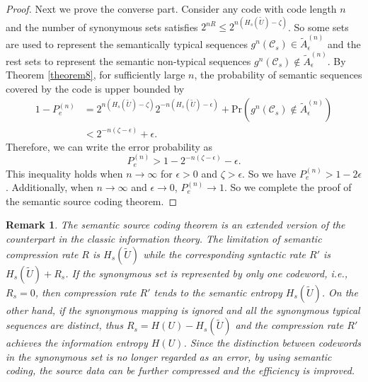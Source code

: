 \documentclass[12pt, draftclsnofoot,onecolumn]{IEEEtran}
\newtheorem{remark}{\bf{Remark}}
\begin{document}
\begin{proof}
Next we prove the converse part. Consider any code with code length $n$ and the number of synonymous sets satisfies $2^{nR}\leq 2^{n\left(H_s(\tilde{U})-\zeta\right)}$. So some sets are used to represent the semantically typical sequences $g^n\left(\mathcal{C}_s\right)\in \tilde{A}_{\epsilon}^{(n)}$ and the rest sets to represent the semantic non-typical sequences $g^n\left(\mathcal{C}_s\right)\notin \tilde{A}_{\epsilon}^{(n)}$. By Theorem \ref{theorem8}, for sufficiently large $n$, the probability of semantic sequences covered by the code is upper bounded by
\begin{equation}
\begin{aligned}
1-P_e^{(n)}&=2^{n\left(H_s(\tilde{U})-\zeta\right)}2^{-n\left(H_s(\tilde{U})-\epsilon\right)}+\text{Pr}(g^n\left(\mathcal{C}_s\right)\notin \tilde{A}_{\epsilon}^{(n)})\\
&< 2^{-n\left(\zeta-\epsilon\right)}+\epsilon.
\end{aligned}
\end{equation}
Therefore, we can write the error probability as
\begin{equation}
P_e^{(n)} > 1-2^{-n\left(\zeta-\epsilon\right)}-\epsilon.
\end{equation}
This inequality holds when $n\to\infty$ for $\epsilon>0$ and $\zeta>\epsilon$. So we have $P_e^{(n)}>1-2\epsilon$. Additionally, when $n\to\infty$ and $\epsilon\to 0$, $P_e^{(n)} \to 1$. So we complete the proof of the semantic source coding theorem.
\end{proof}

\begin{remark}
The semantic source coding theorem is an extended version of the counterpart in the classic information theory. The limitation of semantic compression rate $R$ is $H_s(\tilde{U})$ while the corresponding syntactic rate $R'$ is $H_s(\tilde{U})+R_s$. If the synonymous set is represented by only one codeword, i.e., $R_s=0$, then compression rate $R'$ tends to the semantic entropy $H_s(\tilde{U})$. On the other hand, if the synonymous mapping is ignored and all the synonymous typical sequences are distinct, thus $R_s=H(U)-H_s(\tilde{U})$ and the compression rate $R'$ achieves the information entropy $H(U)$. Since the distinction between codewords in the synonymous set is no longer regarded as an error, by using semantic coding, the source data can be further compressed and the efficiency is improved.
\end{remark}
\end{document}
